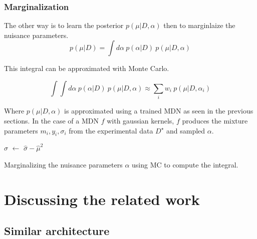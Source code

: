 \subsubsection{Marginalization} %
\label{subsub:marginalization}


The other way is to learn the posterior $p(\mu | D, \alpha)$ then to marginlaize the nuisance parameters.
\begin{equation}
    p(\mu | D) = \int d\alpha ~ p(\alpha | D) ~ p(\mu | D, \alpha)
\end{equation}

This integral can be approximated with Monte Carlo.

\begin{equation}
  \int \int d\alpha ~ p(\alpha | D) ~ p(\mu | D, \alpha)
  \approx \sum_i w_i ~ p(\mu | D, \alpha_i)
\end{equation}

Where $p(\mu | D, \alpha)$ is approximated using a trained MDN as seen in the previous sections.
In the case of a MDN $f$ with gaussian kernels, $f$ produces the mixture parameters $m_i, y_i, \sigma_i$ from the experimental data $D^\star$ and sampled $\alpha$.

\begin{algorithm}[H]
$\hat\sigma$  $\gets$ $\hat\sigma - \hat\mu^2$ \;
\caption{Marginalizing the nuisance parameters $\alpha$ using MC to compute the integral.}
\end{algorithm}







\section{Discussing the related work} %
\label{sec:discussing_the_related_work}

\subsection{Similar architecture} %
\label{sub:similar_architecture}

